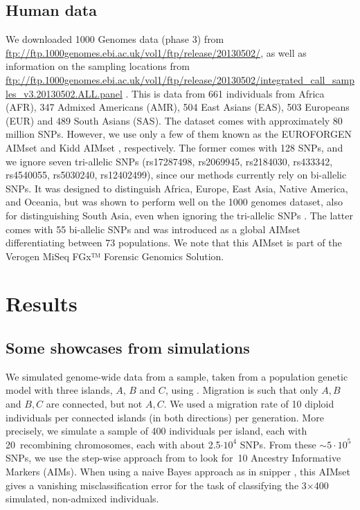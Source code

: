 \documentclass[12pt]{article}
\theoremstyle{definition}
\begin{document}
\subsection{Human data}
\sloppy We downloaded 1000 Genomes data (phase 3) from
\url{ftp://ftp.1000genomes.ebi.ac.uk/vol1/ftp/release/20130502/}, as
well as information on the sampling locations from
\url{ftp://ftp.1000genomes.ebi.ac.uk/vol1/ftp/release/20130502/integrated_call_samples_v3.20130502.ALL.panel}
\cite{Auton2015}. This is data from 661 individuals from Africa (AFR),
347 Admixed Americans (AMR), 504 East Asians (EAS), 503 Europeans
(EUR) and 489 South Asians (SAS). The dataset comes with approximately
80 million SNPs. However, we use only a few of them known as the
EUROFORGEN AIMset \cite{Phillips2014} and Kidd AIMset \cite{Kidd2014},
respectively. The former comes with 128 SNPs, and we ignore seven
tri-allelic SNPs (rs17287498, rs2069945, rs2184030, rs433342,
rs4540055, rs5030240, rs12402499), since our methods currently rely on
bi-allelic SNPs. It was designed to distinguish Africa, Europe, East
Asia, Native America, and Oceania, but was shown to perform well on
the 1000 genomes dataset, also for distinguishing South Asia, even
when ignoring the tri-allelic SNPs \cite{Pfaffelhuber2019}.  The
latter comes with 55 bi-allelic SNPs and was introduced as a global
AIMset differentiating between 73 populations. We note that this
AIMset is part of the Verogen MiSeq FGx™ Forensic Genomics Solution.

\section{Results}

\subsection{Some showcases from simulations}
We simulated genome-wide data from a sample, taken from a population
genetic model with three islands, $A$, $B$ and $C$, using
\cite{Kelleher2016}. Migration is such that only $A, B$ and $B, C$ are
connected, but not $A, C$. We used a migration rate of 10 diploid
individuals per connected islands (in both directions) per
generation. More precisely, we simulate a sample of 400 individuals
per island, each with 20~recombining chromosomes, each with about
2.5$\cdot 10^4$ SNPs. From these $\sim 5\cdot 10^5$ SNPs, we use the
step-wise approach from \cite{Pfaffelhuber2019} to look for~10
Ancestry Informative Markers (AIMs). When using a naive Bayes approach
as in {\sc snipper} \cite{Snipper2007}, this AIMset gives a vanishing
misclassification error for the task of classifying the 3$\times$400
simulated, non-admixed individuals.
\end{document}
